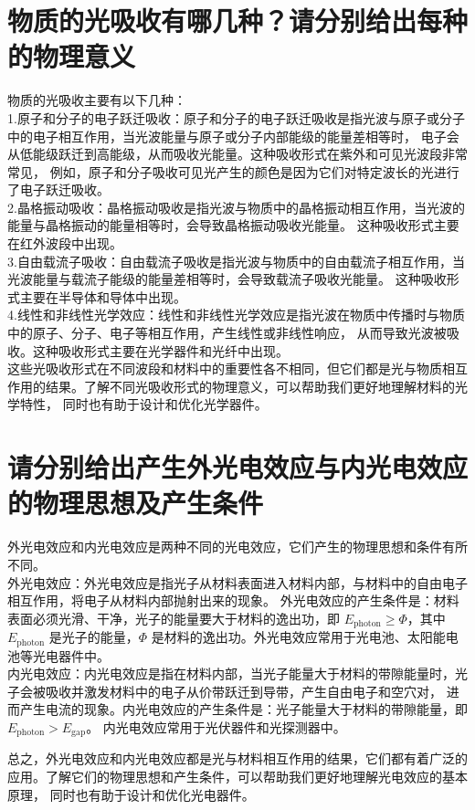 \documentclass[12pt, a4paper, oneside]{article}
\begin{document}
\begin{spacing}{2.0}
\section{物质的光吸收有哪几种？请分别给出每种的物理意义}
物质的光吸收主要有以下几种：
\\
1.原子和分子的电子跃迁吸收：原子和分子的电子跃迁吸收是指光波与原子或分子中的电子相互作用，当光波能量与原子或分子内部能级的能量差相等时，
电子会从低能级跃迁到高能级，从而吸收光能量。这种吸收形式在紫外和可见光波段非常常见，
例如，原子和分子吸收可见光产生的颜色是因为它们对特定波长的光进行了电子跃迁吸收。
\\
2.晶格振动吸收：晶格振动吸收是指光波与物质中的晶格振动相互作用，当光波的能量与晶格振动的能量相等时，会导致晶格振动吸收光能量。
这种吸收形式主要在红外波段中出现。
\\
3.自由载流子吸收：自由载流子吸收是指光波与物质中的自由载流子相互作用，当光波能量与载流子能级的能量差相等时，会导致载流子吸收光能量。
这种吸收形式主要在半导体和导体中出现。
\\
4.线性和非线性光学效应：线性和非线性光学效应是指光波在物质中传播时与物质中的原子、分子、电子等相互作用，产生线性或非线性响应，
从而导致光波被吸收。这种吸收形式主要在光学器件和光纤中出现。
\\
这些光吸收形式在不同波段和材料中的重要性各不相同，但它们都是光与物质相互作用的结果。了解不同光吸收形式的物理意义，可以帮助我们更好地理解材料的光学特性，
同时也有助于设计和优化光学器件。

\section{请分别给出产生外光电效应与内光电效应的物理思想及产生条件}
外光电效应和内光电效应是两种不同的光电效应，它们产生的物理思想和条件有所不同。
\\
外光电效应：外光电效应是指光子从材料表面进入材料内部，与材料中的自由电子相互作用，将电子从材料内部抛射出来的现象。
外光电效应的产生条件是：材料表面必须光滑、干净，光子的能量要大于材料的逸出功，即 $E_{\mathrm{photon}}\geq \Phi$，其中 $E_{\mathrm{photon}}$ 
是光子的能量，$\Phi$ 是材料的逸出功。外光电效应常用于光电池、太阳能电池等光电器件中。
\\
内光电效应：内光电效应是指在材料内部，当光子能量大于材料的带隙能量时，光子会被吸收并激发材料中的电子从价带跃迁到导带，产生自由电子和空穴对，
进而产生电流的现象。内光电效应的产生条件是：光子能量大于材料的带隙能量，即 $E_{\mathrm{photon}}>E_{\mathrm{gap}}$。
内光电效应常用于光伏器件和光探测器中。

总之，外光电效应和内光电效应都是光与材料相互作用的结果，它们都有着广泛的应用。了解它们的物理思想和产生条件，可以帮助我们更好地理解光电效应的基本原理，
同时也有助于设计和优化光电器件。





\end{spacing}
\end{document}
